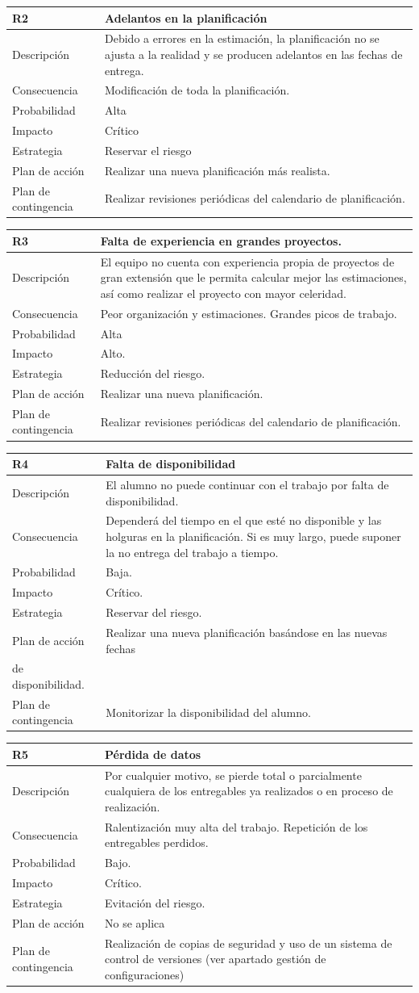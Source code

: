 \documentclass[twoside]{report}
\newcommand\addrow[2]{#1 &#2\\ }
\newcommand\addheading[2]{#1 &#2\\ \hline}
\newcommand\tabularhead{\begin{tabular}{lp{0.7\textwidth}}
\hline
}
\newenvironment{risk}{\tabularhead}
{\hline\end{tabular}}
\begin{document}
\begin{risk}
  \addheading{R2}{Adelantos en la planificación}
  \addrow{Descripción}{Debido a errores en la estimación, la planificación no se ajusta a la realidad y se producen adelantos en las fechas de entrega.}
  \addrow{Consecuencia}{Modificación de toda la planificación.}
  \addrow{Probabilidad}{Alta }
  \addrow{Impacto}{Crítico}
  \addrow{Estrategia}{Reservar el riesgo}
  \addrow{Plan de acción}{Realizar una nueva planificación más realista. }
  \addrow{Plan de contingencia}{Realizar revisiones periódicas del calendario de planificación.}
\end{risk}

\begin{risk}
  \addheading{R3}{Falta de experiencia en grandes proyectos.}
  \addrow{Descripción}{El equipo no cuenta con experiencia propia de proyectos de gran extensión que le permita calcular mejor las estimaciones, así como realizar el proyecto con mayor celeridad.}
  \addrow{Consecuencia}{Peor organización y estimaciones. Grandes picos de trabajo.}
  \addrow{Probabilidad}{Alta }
  \addrow{Impacto}{Alto. }
  \addrow{Estrategia}{Reducción del riesgo.}
  \addrow{Plan de acción}{Realizar una nueva planificación. }
  \addrow{Plan de contingencia}{Realizar revisiones periódicas del calendario de planificación.}
\end{risk}

\begin{risk}
  \addheading{R4}{Falta de disponibilidad}
  \addrow{Descripción}{El alumno no puede continuar con el trabajo por falta de disponibilidad.}
  \addrow{Consecuencia}{Dependerá del tiempo en el que esté no disponible y las holguras en la planificación. Si es muy largo, puede suponer la no entrega del trabajo a tiempo.}
  \addrow{Probabilidad}{Baja.}
  \addrow{Impacto}{Crítico. }
  \addrow{Estrategia}{Reservar del riesgo.}
  \addrow{Plan de acción}{Realizar una nueva planificación basándose en las nuevas fechas \\de disponibilidad.}
  \addrow{Plan de contingencia}{Monitorizar la disponibilidad del alumno.}
\end{risk}

\begin{risk}
  \addheading{R5}{Pérdida de datos}
  \addrow{Descripción}{Por cualquier motivo, se pierde total o parcialmente cualquiera de los entregables ya realizados o en proceso de realización.}
  \addrow{Consecuencia}{Ralentización muy alta del trabajo. Repetición de los entregables perdidos. }
  \addrow{Probabilidad}{Bajo.}
  \addrow{Impacto}{Crítico. }
  \addrow{Estrategia}{Evitación del riesgo.}
  \addrow{Plan de acción}{No se aplica}
  \addrow{Plan de contingencia}{Realización de copias de seguridad y uso de un sistema de control de versiones (ver apartado gestión de configuraciones)}
\end{risk}
\end{document}
